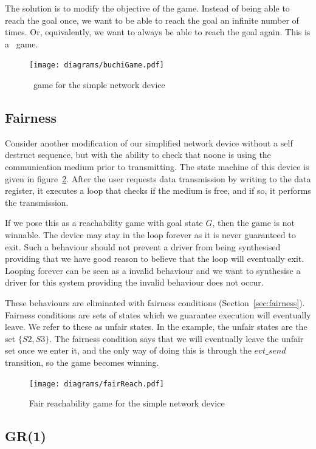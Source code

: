 The solution is to modify the objective of the game. Instead of being able to reach the goal once, we want to be able to reach the goal an infinite number of times. Or, equivalently, we want to always be able to reach the goal again. This is a \buchi\ game.

\begin{figure}
\centering
\texttt{[image: diagrams/buchiGame.pdf]}
\caption{\buchi\ game for the simple network device}
\label{fig:buchi}
\end{figure}

\subsection{Fairness}
\label{sec:game_fairness}

Consider another modification of our simplified network device without a self destruct sequence, but with the ability to check that noone is using the communication medium prior to transmitting. The state machine of this device is given in figure~\ref{fig:fair}. After the user requests data transmission by writing to the data register, it executes a loop that checks if the medium is free, and if so, it performs the transmission. 

If we pose this as a reachability game with goal state $G$, then the game is not winnable. The device may stay in the loop forever as it is never guaranteed to exit. Such a behaviour should not prevent a driver from being synthesised providing that we have good reason to believe that the loop will eventually exit. Looping forever can be seen as a invalid behaviour and we want to synthesise a driver for this system providing the invalid behaviour does not occur. 

These behaviours are eliminated with fairness conditions (Section~\ref{sec:fairness}). Fairness conditions are sets of states which we guarantee execution will eventually leave. We refer to these as unfair states. In the example, the unfair states are the set $\{S2, S3\}$. The fairness condition says that we will eventually leave the unfair set once we enter it, and the only way of doing this is through the $evt\_send$ transition, so the game becomes winning.

\begin{figure}[t]
\centering
\texttt{[image: diagrams/fairReach.pdf]}
\caption{Fair reachability game for the simple network device}
\label{fig:fair}
\end{figure}

\subsection{GR(1)}

